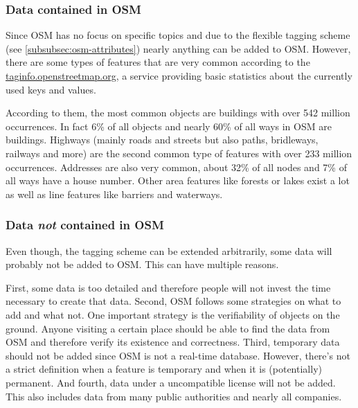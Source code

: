 		\subsubsection{Data contained in OSM}
		
			Since OSM has no focus on specific topics and due to the flexible tagging scheme (see \cref{subsubsec:osm-attributes}) nearly anything can be added to OSM.
			However, there are some types of features that are very common according to the \href{https://taginfo.openstreetmap.org/keys}{taginfo.openstreetmap.org}, a service providing basic statistics about the currently used keys and values\cite{taginfo-keys}.
			
			According to them, the most common objects are buildings with over 542 million occurrences.
			In fact 6\% of all objects and nearly 60\% of all ways in OSM are buildings.
			Highways (mainly roads and streets but also paths, bridleways, railways and more) are the second common type of features with over 233 million occurrences.
			Addresses are also very common, about 32\% of all nodes and 7\% of all ways have a house number.
			Other area features like forests or lakes exist a lot as well as line features like barriers and waterways.
			
			
		\subsubsection{Data \textit{not} contained in OSM}
		
			Even though, the tagging scheme can be extended arbitrarily, some data will probably not be added to OSM.
			This can have multiple reasons.
			
			First, some data is too detailed and therefore people will not invest the time necessary to create that data.
			Second, OSM follows some strategies on what to add and what not.
			One important strategy is the verifiability of objects on the ground.
			Anyone visiting a certain place should be able to find the data from OSM and therefore verify its existence and correctness.
			Third, temporary data should not be added since OSM is not a real-time database.
			However, there's not a strict definition when a feature is temporary and when it is (potentially) permanent.
			And fourth, data under a uncompatible license will not be added.
			This also includes data from many public authorities and nearly all companies.
			
